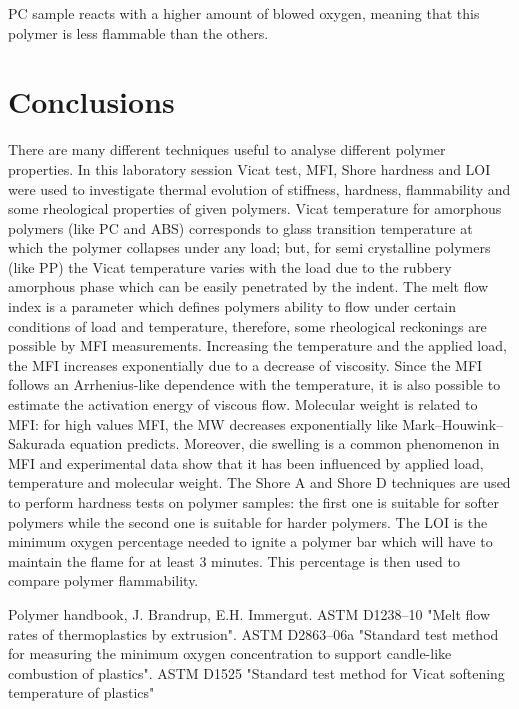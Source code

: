 \documentclass[a4paper, 11pt]{article}
\begin{document}
PC sample reacts with a higher amount of blowed oxygen, meaning that this polymer is less flammable than the others.
\newpage 
\section{Conclusions}

There are many different techniques useful to analyse different polymer properties. In this laboratory session Vicat test, MFI, Shore hardness and LOI were used to investigate thermal evolution of stiffness, hardness, flammability and some rheological properties of given polymers.
Vicat temperature for amorphous polymers (like PC and ABS) corresponds to glass transition temperature at which the polymer collapses under any load; but, for semi crystalline polymers (like PP) the Vicat temperature varies with the load due to the rubbery amorphous phase which can be easily penetrated by the indent.
The melt flow index is a parameter which defines polymers ability to flow under certain conditions of load and temperature, therefore, some rheological reckonings are possible by MFI measurements. Increasing the temperature and the applied load, the MFI increases exponentially due to a decrease of viscosity. Since the MFI follows an Arrhenius-like dependence with the temperature, it is also possible to estimate the activation energy of viscous flow. Molecular weight is related to MFI: for high values MFI, the MW decreases exponentially like Mark–Houwink–Sakurada equation predicts. Moreover, die swelling is a common phenomenon in MFI and experimental data show that it has been influenced by applied load, temperature and molecular weight.
The Shore A and Shore D techniques are used to perform hardness tests on polymer samples: the first one is suitable for softer polymers while the second one is suitable for harder polymers.
The LOI is the minimum oxygen percentage needed to ignite a polymer bar which will have to maintain the flame for at least 3 minutes. This percentage is then used to compare polymer flammability.

\newpage

\thispagestyle{empty}

\begin{thebibliography}{1}

 Polymer handbook, J. Brandrup, E.H. Immergut.
 ASTM D1238–10 "Melt flow rates of thermoplastics by extrusion". 
 ASTM D2863–06a "Standard test method for measuring the minimum oxygen concentration to support candle-like combustion of plastics".
 ASTM D1525 "Standard test method for Vicat softening temperature of plastics"

\end{thebibliography}
\end{document}
